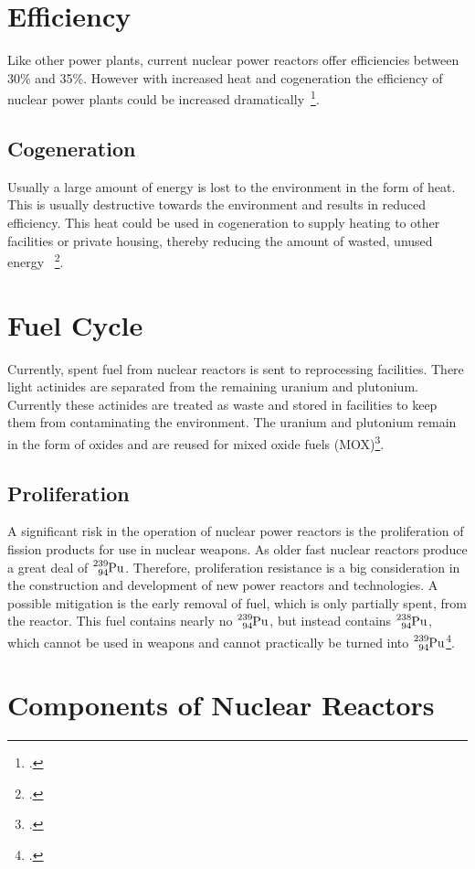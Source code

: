 \section{Efficiency}
Like other power plants, current nuclear power reactors offer efficiencies between 30\% and 35\%.
However with increased heat and cogeneration the efficiency of nuclear power plants could be increased
dramatically~\footcite{energyed}.
\subsection{Cogeneration}
Usually a large amount of energy is lost to the environment in the form of heat. This is usually destructive
towards the environment and results in reduced efficiency. This heat could be used in cogeneration to
supply heating to other facilities or private housing, thereby reducing the amount of wasted, unused energy
~\footcite{iaeaeff}.
\section{Fuel Cycle}
Currently, spent fuel from nuclear reactors is sent to reprocessing facilities. There light actinides are
separated from the remaining uranium and plutonium. Currently these actinides are treated as waste and
stored in facilities to keep them from contaminating the environment. The uranium and plutonium remain
in the form of oxides and are reused for mixed oxide fuels (MOX)\footcite[82-84]{T4Gen}.

\subsection{Proliferation}
A significant risk in the operation of nuclear power reactors is the proliferation of fission products for
use in nuclear weapons. As older fast nuclear reactors produce a great deal of $\ce{^{239}_{94}Pu}$.
Therefore, proliferation resistance is a big consideration in the construction and development of new
power reactors and technologies. A possible mitigation is the early removal of fuel, which is only
partially spent, from the reactor. This fuel contains nearly no $\ce{^{239}_{94}Pu}$, but instead contains
$\ce{^{238}_{94}Pu}$, which cannot be used in weapons and cannot practically be turned into $\ce{^{239}_{94}Pu}$\footcite[87]{T4Gen}.

\section{Components of Nuclear Reactors}
